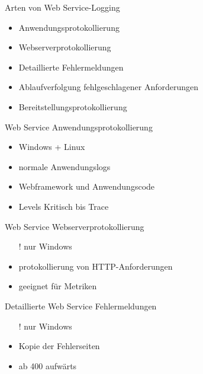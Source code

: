 \begin{flashcard}[Definition]{Arten von Web Service-Logging}
    \begin{itemize}
        \item Anwendungsprotokollierung
        \item Webserverprotokollierung
        \item Detaillierte Fehlermeldungen
        \item Ablaufverfolgung fehlgeschlagener Anforderungen
        \item Bereitstellungsprotokollierung
    \end{itemize}
\end{flashcard}

\begin{flashcard}[Definition]{Web Service Anwendungsprotokollierung}
    \begin{itemize}
        \item Windows + Linux
        \item normale Anwendungslogs
        \item Webframework und Anwendungscode
        \item Levels Kritisch bis Trace
    \end{itemize}
\end{flashcard}

\begin{flashcard}[Definition]{Web Service Webserverprotokollierung}
    \begin{itemize}
        \item[!] nur Windows
        \item protokollierung von HTTP-Anforderungen
        \item geeignet für Metriken
    \end{itemize}
\end{flashcard}

\begin{flashcard}[Definition]{Detaillierte Web Service Fehlermeldungen}
    \begin{itemize}
        \item[!] nur Windows
        \item Kopie der Fehlerseiten
        \item ab 400 aufwärts
    \end{itemize}
\end{flashcard}

